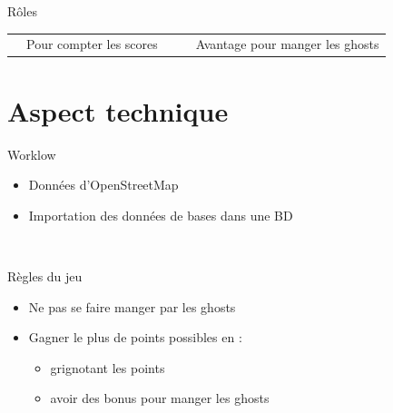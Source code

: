 \documentclass{beamer}
\begin{document}
\begin{frame}{Rôles}
\begin{table}
\begin{tabular}{lp{2cm}p{0.5cm}lp{2cm}}
                                                                                 & {\footnotesize Pour compter les scores} & &                                                               & {\footnotesize Avantage pour manger les ghosts}             \\
            \end{tabular}
    \end{table}
\end{frame}

\section{Aspect technique}
\begin{frame}{Worklow}
    \begin{itemize}[label=$\rhd$]
        \item Données d'OpenStreetMap
        \item Importation des données de bases dans une BD
    \end{itemize}
    \begin{figure}
         \\
    \end{figure}
\end{frame}

\begin{frame}{Règles du jeu}
    \begin{itemize}[label=$\rhd$]
        \item Ne pas se faire manger par les ghosts
        \item Gagner le plus de points possibles en :
        \begin{itemize}[label=>]
            \item grignotant les points
            \item avoir des bonus pour manger les ghosts
        \end{itemize}
    \end{itemize}
\end{frame}
\end{document}
